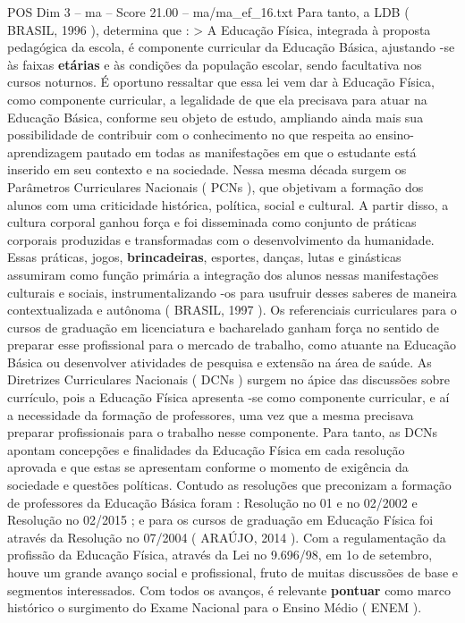 \begin{textsample}{POS Dim 3 – ma – Score 21.00 – ma/ma\_ef\_16.txt}
Para tanto, a LDB ( BRASIL, 1996 ), determina que : > A Educação Física, integrada à proposta pedagógica da escola, é componente curricular da Educação Básica, ajustando -se às faixas \textbf{etárias} e às condições da população escolar, sendo facultativa nos cursos noturnos.
É oportuno ressaltar que essa lei vem dar à Educação Física, como componente curricular, a legalidade de que ela precisava para atuar na Educação Básica, conforme seu objeto de estudo, ampliando ainda mais sua possibilidade de contribuir com o conhecimento no que respeita ao ensino-aprendizagem pautado em todas as manifestações em que o estudante está inserido em seu contexto e na sociedade.
Nessa mesma década surgem os Parâmetros Curriculares Nacionais ( PCNs ), que objetivam a formação dos alunos com uma criticidade histórica, política, social e cultural.
A partir disso, a cultura corporal ganhou força e foi disseminada como conjunto de práticas corporais produzidas e transformadas com o desenvolvimento da humanidade.
Essas práticas, jogos, \textbf{brincadeiras}, esportes, danças, lutas e ginásticas assumiram como função primária a integração dos alunos nessas manifestações culturais e sociais, instrumentalizando -os para usufruir desses saberes de maneira contextualizada e autônoma ( BRASIL, 1997 ).
Os referenciais curriculares para o cursos de graduação em licenciatura e bacharelado ganham força no sentido de preparar esse profissional para o mercado de trabalho, como atuante na Educação Básica ou desenvolver atividades de pesquisa e extensão na área de saúde.
As Diretrizes Curriculares Nacionais ( DCNs ) surgem no ápice das discussões sobre currículo, pois a Educação Física apresenta -se como componente curricular, e aí a necessidade da formação de professores, uma vez que a mesma precisava preparar profissionais para o trabalho nesse componente.
Para tanto, as DCNs apontam concepções e finalidades da Educação Física em cada resolução aprovada e que estas se apresentam conforme o momento de exigência da sociedade e questões políticas.
Contudo as resoluções que preconizam a formação de professores da Educação Básica foram : Resolução no 01 e no 02/2002 e Resolução no 02/2015 ; e para os cursos de graduação em Educação Física foi através da Resolução no 07/2004 ( ARAÚJO, 2014 ).
Com a regulamentação da profissão da Educação Física, através da Lei no 9.696/98, em 1o de setembro, houve um grande avanço social e profissional, fruto de muitas discussões de base e segmentos interessados.
Com todos os avanços, é relevante \textbf{pontuar} como marco histórico o surgimento do Exame Nacional para o Ensino Médio ( ENEM ).

\end{textsample}
